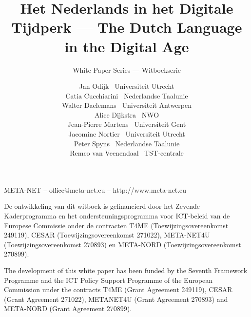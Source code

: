 \documentclass[]{../../metanetpaper}
\title{Het Nederlands in het Digitale Tijdperk --- The Dutch Language in the Digital Age}
\subtitle{White Paper Series --- Witboekserie}
\author{
Jan Odijk~ {\small Universiteit Utrecht} \\
Catia Cucchiarini~ {\small Nederlandse Taalunie}\\
Walter Daelemans~ {\small Universiteit Antwerpen}\\
Alice Dijkstra~ {\small NWO}\\
Jean-Pierre Martens~ {\small Universiteit Gent}\\
Jacomine Nortier~ {\small Universiteit Utrecht}\\
Peter Spyns~ {\small Nederlandse Taalunie}\\
Remco van Veenendaal~ {\small TST-centrale}
}
\begin{document}
\maketitle
\null
\pagestyle{empty} 

\centerline{META-NET -- office@meta-net.eu -- http://www.meta-net.eu}

\vfill

\begin{small}
De ontwikkeling van dit witboek is gefinancierd door het Zevende Kaderprogramma en het  ondersteuningsprogramma voor ICT-beleid van de Europese Commissie onder de contracten T4ME (Toewijzingsovereenkomst 249119), CESAR (Toewijzingsovereenkomst 271022), META-NET4U (Toewijzingsovereenkomst 270893) en META-NORD (Toewijzingsovereenkomst 270899).
\end{small}

\bigskip
\begin{small}
  The development of this white paper has been funded by the Seventh
  Framework Programme and the ICT Policy Support Programme of the
  European Commission under the contracts T4ME (Grant Agreement 249119),
  CESAR (Grant Agreement 271022), METANET4U (Grant Agreement 270893)
  and META-NORD (Grant Agreement 270899).
\end{small}

\clearpage

\setcounter{page}{5}
\pagestyle{scrheadings}

\cleardoublepage


\end{document}
